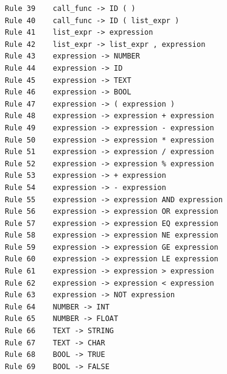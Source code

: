 \begin{verbatim}
Rule 39    call_func -> ID ( )
Rule 40    call_func -> ID ( list_expr )
Rule 41    list_expr -> expression
Rule 42    list_expr -> list_expr , expression
Rule 43    expression -> NUMBER
Rule 44    expression -> ID
Rule 45    expression -> TEXT
Rule 46    expression -> BOOL
Rule 47    expression -> ( expression )
Rule 48    expression -> expression + expression
Rule 49    expression -> expression - expression
Rule 50    expression -> expression * expression
Rule 51    expression -> expression / expression
Rule 52    expression -> expression % expression
Rule 53    expression -> + expression
Rule 54    expression -> - expression
Rule 55    expression -> expression AND expression
Rule 56    expression -> expression OR expression
Rule 57    expression -> expression EQ expression
Rule 58    expression -> expression NE expression
Rule 59    expression -> expression GE expression
Rule 60    expression -> expression LE expression
Rule 61    expression -> expression > expression
Rule 62    expression -> expression < expression
Rule 63    expression -> NOT expression
Rule 64    NUMBER -> INT
Rule 65    NUMBER -> FLOAT
Rule 66    TEXT -> STRING
Rule 67    TEXT -> CHAR
Rule 68    BOOL -> TRUE
Rule 69    BOOL -> FALSE
\end{verbatim}